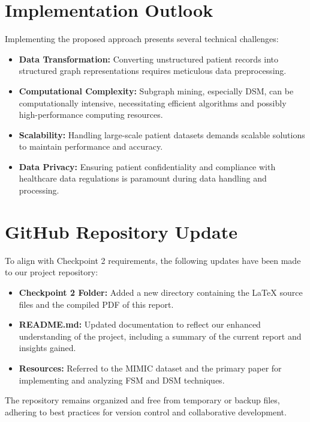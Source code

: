 \documentclass[12pt]{article}
\begin{document}
\section{Implementation Outlook}

Implementing the proposed approach presents several technical challenges:
\begin{itemize}
\item \textbf{Data Transformation:} Converting unstructured patient records into structured graph representations requires meticulous data preprocessing.
\item \textbf{Computational Complexity:} Subgraph mining, especially DSM, can be computationally intensive, necessitating efficient algorithms and possibly high-performance computing resources.
\item \textbf{Scalability:} Handling large-scale patient datasets demands scalable solutions to maintain performance and accuracy.
\item \textbf{Data Privacy:} Ensuring patient confidentiality and compliance with healthcare data regulations is paramount during data handling and processing.
\end{itemize}

\section{GitHub Repository Update}

To align with Checkpoint 2 requirements, the following updates have been made to our project repository:
\begin{itemize}
\item \textbf{Checkpoint 2 Folder:} Added a new directory containing the LaTeX source files and the compiled PDF of this report.
\item \textbf{README.md:} Updated documentation to reflect our enhanced understanding of the project, including a summary of the current report and insights gained.
\item \textbf{Resources:} Referred to the MIMIC dataset and the primary paper for implementing and analyzing FSM and DSM techniques.
\end{itemize}

The repository remains organized and free from temporary or backup files, adhering to best practices for version control and collaborative development.
\end{document}
